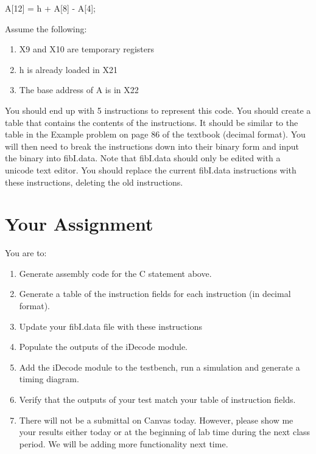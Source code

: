 A[12] = h + A[8] - A[4];

Assume the following:
\begin{enumerate}
\item X9 and X10 are temporary registers
\item h is already loaded in X21
\item The base address of A is in X22
\end{enumerate}

You should end up with 5 instructions to represent this code.  You should create a table that contains the contents of the instructions.  It should be similar to the table in the Example problem on page 86 of the textbook (decimal format).  You will then need to break the instructions down into their binary form and input the binary into fibI.data.  Note that fibI.data should only be edited with a unicode text editor.  You should replace the current fibI.data instructions with these instructions, deleting the old instructions.  

\clearpage
\section{Your Assignment}

You are to:
\begin{enumerate}
\item Generate assembly code for the C statement above.
\item Generate a table of the instruction fields for each instruction (in decimal format).
\item Update your fibI.data file with these instructions	
\item Populate the outputs of the iDecode module.
\item Add the iDecode module to the testbench, run a simulation and generate a timing diagram.
\item Verify that the outputs of your test match your table of instruction fields.
\item There will not be a submittal on Canvas today.  However, please show me your results either today or at the beginning of lab time during the next class period.  We will be adding more functionality next time.
\end{enumerate} 